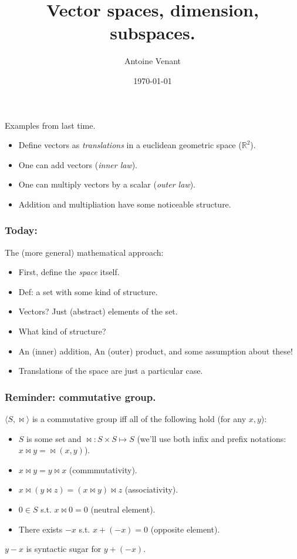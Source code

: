 \documentclass{beamer}
\begin{document}
\title{Vector spaces, dimension, subspaces.} 
\author{Antoine Venant}
\date{\today}
\maketitle


\begin{frame}{Examples from last time.}
  
  \begin{itemize}
  \item Define vectors as \emph{translations} in a euclidean geometric space ($\mathbb{R}^2$).
  \item One can add vectors (\emph{inner law}).
  \item One can multiply vectors by a scalar (\emph{outer law}).
  \item Addition and multipliation have some noticeable structure.
  \end{itemize}
\end{frame}

\begin{frame}
  \frametitle{Today:}
  The (more general) mathematical approach:
  \begin{itemize}
  \item First, define the \emph{space} itself.
  \item Def: a set with some kind of structure.
  \item Vectors? Just (abstract) elements of the set.
  \item What kind of structure?
  \item An (inner) addition, An (outer) product, and some assumption about these!
  \item Translations of the space are just a particular case.
  \end{itemize}  
\end{frame}

\begin{frame}
  \frametitle{Reminder: commutative group.}

  $\langle S, \bowtie \rangle$ is a commutative group iff all of the following hold (for any $x, y$):
  \begin{itemize}
  \item $S$ is some set and $\bowtie: S \times S \mapsto S$ (we'll use both infix and prefix notations: $x \bowtie y = \bowtie(x, y)$).
  \item $x \bowtie y = y \bowtie x$ (commmutativity).
  \item $x \bowtie (y \bowtie z) = (x \bowtie y) \bowtie z$ (associativity).
  \item $0 \in S$ s.t. $x \bowtie 0 = 0$ (neutral element).
  \item There exists $-x$ s.t. $x + (-x) = 0$ (opposite element).
  \end{itemize}

  \begin{center}
    $y - x$ is syntactic sugar for $y + (-x)$.
  \end{center}
\end{frame}
\end{document}
